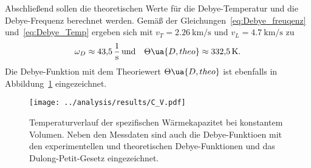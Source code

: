 Abschließend sollen die theoretischen Werte für die Debye-Temperatur und die Debye-Frequenz berechnet werden.
Gemäß der Gleichungen~\eqref{eq:Debye_freuqenz} und~\eqref{eq:Debye_Temp} ergeben sich mit $v_T = \SI{2.26}{\kilo\meter\per\second}$
und $v_L = \SI{4.7}{\kilo\meter\per\second}$ zu 
\begin{equation}
        \omega_D \approx \SI{43.5}{\per\second} \, \text{und} \quad \Theta\ua{D, theo} \approx \SI{332.5}{\kelvin}.
\end{equation}
Die Debye-Funktion mit dem Theoriewert $\Theta\ua{D, theo}$ ist ebenfalls in Abbildung~\ref{fig: C_V} eingezeichnet.

\begin{figure}
\centering
\texttt{[image: ../analysis/results/C\_V.pdf]}
\caption{Temperaturverlauf der spezifischen Wärmekapazitet bei konstantem Volumen. Neben den Messdaten sind auch die 
Debye-Funktioen mit den experimentellen und theoretischen Debye-Funktionen und das Dulong-Petit-Gesetz eingezeichnet.}
\label{fig: C_V}
\end{figure}

